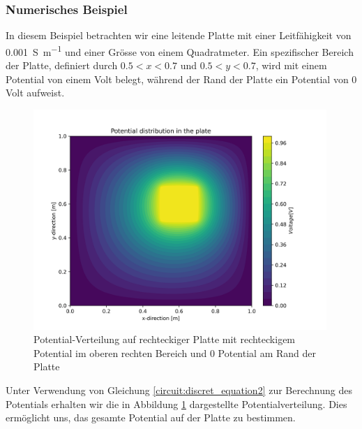 \subsubsection{Numerisches Beispiel}
In diesem Beispiel betrachten wir eine leitende Platte mit einer Leitfähigkeit von \SI{0.001}{\siemens\per\meter} und einer Grösse von einem Quadratmeter. Ein spezifischer Bereich der Platte, definiert durch $0.5 < x < 0.7$ und $0.5 < y < 0.7$, wird mit einem Potential von einem Volt belegt, während der Rand der Platte ein Potential von 0 Volt aufweist.
\begin{figure}
	\centering
	\includegraphics[width=0.99\textwidth]{papers/circuit/potential_distribution.png}
	\caption{Potential-Verteilung auf rechteckiger Platte mit rechteckigem Potential im oberen rechten Bereich und 0 Potential am Rand der Platte \cite{github:AndreasFMueller}}
	\label{fig:potential_distribution}
\end{figure}
Unter Verwendung von Gleichung \eqref{circuit:discret_equation2} zur Berechnung des Potentials erhalten wir die in Abbildung \ref{fig:potential_distribution} dargestellte Potentialverteilung. Dies ermöglicht uns, das gesamte Potential auf der Platte zu bestimmen.

